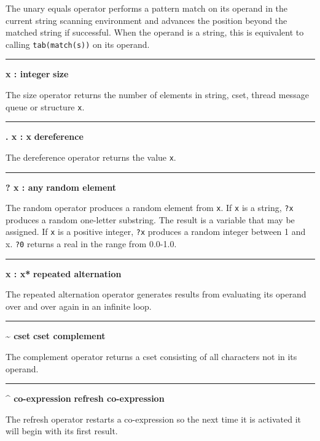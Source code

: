 \noindent
{}The unary equals operator
performs a pattern match on its operand in the current string scanning
environment and advances the position beyond the matched string
if successful.
When the operand is a string, this is
equivalent to calling \texttt{tab(match(s))} on its operand.

\bigskip\hrule\vspace{0.1cm}
\noindent
{\bf * x : integer } \hfill {\bf size}

\noindent
The size operator returns the number of elements in
string, cset, thread message queue or structure \texttt{x}.

\bigskip\hrule\vspace{0.1cm}
\noindent
{\bf . x : x } \hfill {\bf dereference}

\noindent
The dereference operator returns the value
\texttt{x}.

\bigskip\hrule\vspace{0.1cm}
\noindent
{\bf ? x : any } \hfill {\bf random element}

\noindent
The random operator produces a random element
from \texttt{x}. If \texttt{x} is a string, \texttt{?x} produces a
random one-letter substring. The result is a variable that may be
assigned. If \texttt{x} is a positive integer, \texttt{?x} produces a
random integer between 1 and x.  \texttt{?0} returns a real in the
range from 0.0-1.0.

\bigskip\hrule\vspace{0.1cm}
\noindent
{\bf {\textbar} x : x* } \hfill {\bf repeated alternation}

\noindent
The repeated alternation operator generates
results from evaluating its operand over and over again in an infinite
loop.

\bigskip\hrule\vspace{0.1cm}
\noindent
{\bf \~{} cset } \hfill {\bf cset complement}

\noindent
The complement operator returns a cset
consisting of all characters not in its operand.

\bigskip\hrule\vspace{0.1cm}
\noindent
{\bf \^{} co{}-expression } \hfill {\bf refresh co{}-expression}

\noindent
{}The refresh operator restarts a
co-expression so the next time it is activated it will begin with its
first result.

